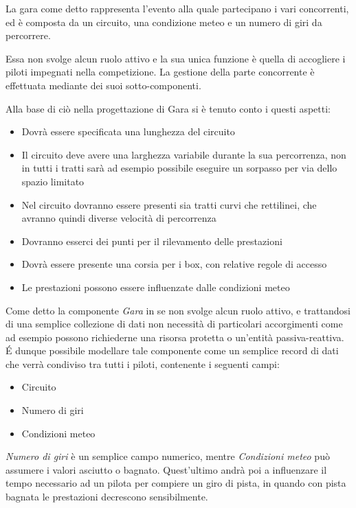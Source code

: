 \documentclass[a4paper,11pt, twoside]{book}
\begin{document}
      La gara come detto rappresenta l'evento alla quale partecipano i vari concorrenti, ed è composta
      da un circuito, una condizione meteo e un numero di giri da percorrere.
      
      Essa non svolge alcun ruolo attivo
      e la sua unica funzione è quella di accogliere i piloti impegnati nella competizione. 
      La gestione della parte concorrente è effettuata mediante dei suoi sotto-componenti. 
      
      Alla base di ciò nella progettazione di Gara si è tenuto conto i questi aspetti:
	
	\begin{itemize}
	  \item Dovrà essere specificata una lunghezza del circuito
	  \item Il circuito deve avere una larghezza variabile durante la sua percorrenza, non in tutti i tratti sarà
		ad esempio possibile eseguire un sorpasso per via dello spazio limitato
	  \item Nel circuito dovranno essere presenti sia tratti curvi che rettilinei, che avranno quindi diverse velocità
		di percorrenza
	  \item Dovranno esserci dei punti per il rilevamento delle prestazioni
	  \item Dovrà essere presente una corsia per i box, con relative regole di accesso
	  \item Le prestazioni possono essere influenzate dalle condizioni meteo
	\end{itemize}
	
      Come detto la componente \textsl{Gara} in se non svolge alcun ruolo attivo, e trattandosi di una semplice
      collezione di dati non necessità di particolari accorgimenti come ad esempio possono richiederne una risorsa protetta
      o un'entità passiva-reattiva. É dunque possibile modellare tale componente come un semplice record di dati 
      che verrà condiviso tra tutti i piloti, contenente i seguenti campi:
      
      \begin{itemize}
	\item Circuito
	\item Numero di giri
	\item Condizioni meteo
      \end{itemize}
      
      \textsl{Numero di giri} è un semplice campo numerico, mentre \textsl{Condizioni meteo} può assumere i 
      valori asciutto o bagnato. Quest'ultimo andrà poi a influenzare il tempo necessario ad un pilota per compiere 
      un giro di pista, in quando con pista bagnata le prestazioni decrescono sensibilmente.
      
\end{document}
